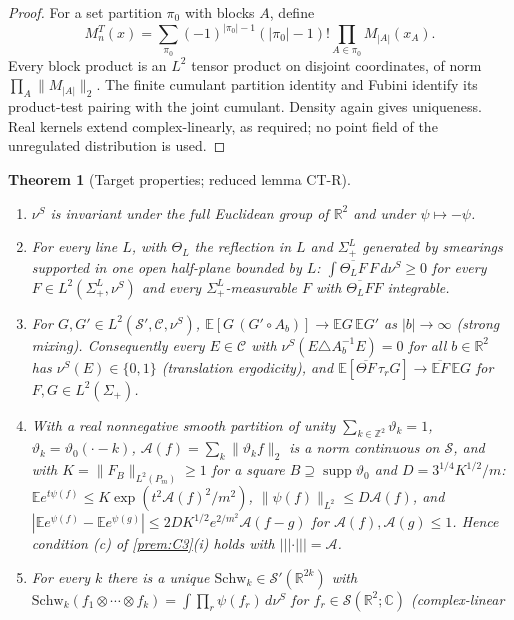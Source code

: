 \documentclass[11pt]{article}
\theoremstyle{plain}
\newtheorem{theorem}{Theorem}[section]
\theoremstyle{definition}
\theoremstyle{remark}
\newcommand{\R}{\mathbb{R}}
\newcommand{\C}{\mathbb{C}}
\newcommand{\Z}{\mathbb{Z}}
\newcommand{\E}{\mathbb{E}}
\newcommand{\cC}{\mathcal{C}}
\newcommand{\cS}{\mathcal{S}}
\newcommand{\cA}{\mathcal{A}}
\newcommand{\Schw}{\mathrm{Schw}}
\newcommand{\conj}[1]{\overline{#1}}
\DeclareMathOperator{\supp}{supp}
\begin{document}
\begin{proof}
For a set partition $\pi_0$ with blocks $A$, define
\begin{equation}\label{eq:local-cumulant-kernel}
 M_n^T(x)=\sum_{\pi_0}(-1)^{|\pi_0|-1}(|\pi_0|-1)!
                    \prod_{A\in\pi_0}M_{|A|}(x_A).
\end{equation}
Every block product is an $L^2$ tensor product on disjoint coordinates,
of norm $\prod_A\|M_{|A|}\|_2$. The finite cumulant partition identity
and Fubini identify its product-test pairing with the joint cumulant.
Density again gives uniqueness. Real kernels extend complex-linearly,
as required; no point field of the unregulated distribution is used.
\end{proof}


\begin{theorem}[Target properties; reduced lemma CT-R]\label{thm:CT}
\begin{enumerate}[label=(\roman*)]
\item $\nu^{S}$ is invariant under the full Euclidean group of $\R^{2}$ and under
  $\psi\mapsto-\psi$.
\item For every line $L$, with $\Theta_L$ the reflection in $L$ and $\Sigma^{L}_{+}$ generated by
  smearings supported in one open half-plane bounded by $L$:
  $\int\conj{\Theta_LF}\,F\,d\nu^{S}\ge0$ for every $F\in L^{2}(\Sigma^{L}_{+},\nu^{S})$ and every
  $\Sigma^{L}_{+}$-measurable $F$ with $\conj{\Theta_LF}F$ integrable.
\item For $G,G'\in L^{2}(\cS',\cC,\nu^{S})$, $\E[G\,(G'\circ A_b)]\to\E G\,\E G'$ as $|b|\to\infty$
  (strong mixing). Consequently every $E\in\cC$ with $\nu^{S}(E\triangle A_b^{-1}E)=0$ for all
  $b\in\R^{2}$ has $\nu^{S}(E)\in\{0,1\}$ (translation ergodicity), and
  $\E[\conj{\Theta F}\,\tau_rG]\to\conj{\E F}\,\E G$ for $F,G\in L^{2}(\Sigma_+)$.
\item With a real nonnegative smooth partition of unity $\sum_{k\in\Z^{2}}\vartheta_k=1$,
  $\vartheta_k=\vartheta_0(\cdot-k)$, $\cA(f)=\sum_k\|\vartheta_kf\|_2$ is a norm continuous on $\cS$, and
  with $K=\|F_B\|_{L^{2}(P_m)}\ge1$ for a square $B\supseteq\supp\vartheta_0$ and
  $D=3^{1/4}K^{1/2}/m$: $\E e^{t\psi(f)}\le K\exp(t^{2}\cA(f)^{2}/m^{2})$,
  $\|\psi(f)\|_{L^{2}}\le D\cA(f)$, and
  $|\E e^{\psi(f)}-\E e^{\psi(g)}|\le2DK^{1/2}e^{2/m^{2}}\cA(f-g)$ for $\cA(f),\cA(g)\le1$. Hence
  condition (c) of \ref{prem:C3}(i) holds with $|||\cdot|||=\cA$.
\item For every $k$ there is a unique $\Schw_k\in\cS'(\R^{2k})$ with
  $\Schw_k(f_1\otimes\cdots\otimes f_k)=\int\prod_r\psi(f_r)\,d\nu^{S}$ for $f_r\in\cS(\R^{2};\C)$ (complex-linear

\end{enumerate}
\end{theorem}
\end{document}
